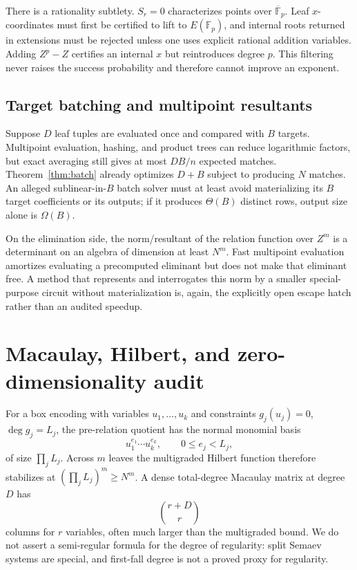 \documentclass[11pt]{article}
\newcommand{\F}{\mathbb F}
\begin{document}
There is a rationality subtlety.  $S_r=0$ characterizes points over
$\overline{\F}_p$.  Leaf $x$-coordinates must first be certified to lift to
$E(\F_p)$, and internal roots returned in extensions must be rejected unless
one uses explicit rational addition variables.  Adding $Z^p-Z$ certifies an
internal $x$ but reintroduces degree $p$.  This filtering never raises the
success probability and therefore cannot improve an exponent. %

\subsection{Target batching and multipoint resultants}

Suppose $D$ leaf tuples are evaluated once and compared with $B$ targets.
Multipoint evaluation, hashing, and product trees can reduce logarithmic
factors, but exact averaging still gives at most $DB/n$ expected matches.
Theorem~\ref{thm:batch} already optimizes $D+B$ subject to producing $N$
matches.  An alleged sublinear-in-$B$ batch solver must at least avoid
materializing its $B$ target coefficients or its outputs; if it produces
$\Theta(B)$ distinct rows, output size alone is $\Omega(B)$.

On the elimination side, the norm/resultant of the relation function over
$Z^m$ is a determinant on an algebra of dimension at least $N^m$.  Fast
multipoint evaluation amortizes evaluating a precomputed eliminant but does not
make that eliminant free.  A method that represents and interrogates this norm
by a smaller special-purpose circuit without materialization is, again, the
explicitly open escape hatch rather than an audited speedup. %

\section{Macaulay, Hilbert, and zero-dimensionality audit}

For a box encoding with variables $u_1,\ldots,u_k$ and constraints
$g_j(u_j)=0$, $\deg g_j=L_j$, the pre-relation quotient has the normal monomial
basis
\[
 u_1^{e_1}\cdots u_k^{e_k},\qquad 0\le e_j<L_j,                    \tag{16}
\]
of size $\prod_jL_j$.  Across $m$ leaves the multigraded Hilbert function
therefore stabilizes at $(\prod_jL_j)^m\ge N^m$.  A dense total-degree Macaulay
matrix at degree $D$ has
\[
 \binom{r+D}{r}                                                     \tag{17}
\]
columns for $r$ variables, often much larger than the multigraded bound.  We do
not assert a semi-regular formula for the degree of regularity: split Semaev
systems are special, and first-fall degree is not a proved proxy for regularity. %
\end{document}
